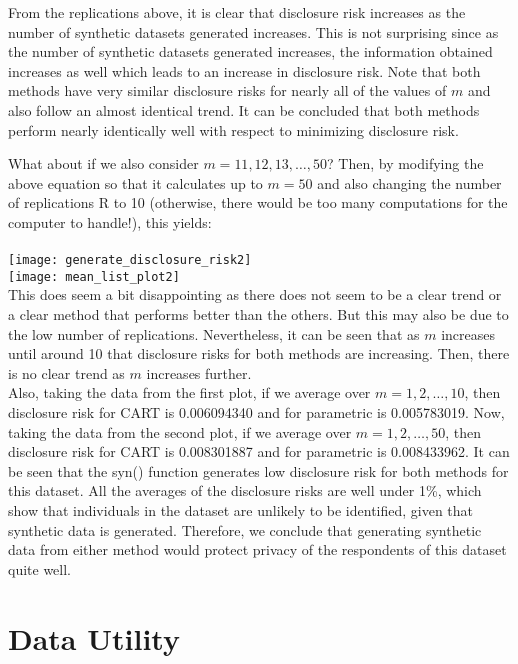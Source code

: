 \documentclass[12pt]{article}
\begin{document}
From the replications above, it is clear that disclosure risk increases as the number of synthetic datasets generated increases. This is not surprising since as the number of synthetic datasets generated increases, the information obtained increases as well which leads to an increase in disclosure risk. Note that both methods have very similar disclosure risks for nearly all of the values of $m$ and also follow an almost identical trend. It can be concluded that both methods perform nearly identically well with respect to minimizing disclosure risk.

What about if we also consider $m=11,12,13,\dots, 50$? Then, by modifying the above equation so that it calculates up to $m=50$ and also changing the number of replications R to 10 (otherwise, there would be too many computations for the computer to handle!), this yields:\\\\
\texttt{[image: generate\_disclosure\_risk2]}\\
\texttt{[image: mean\_list\_plot2]}\\

This does seem a bit disappointing as there does not seem to be a clear trend or a clear method that performs better than the others. But this may also be due to the low number of replications. Nevertheless, it can be seen that as $m$ increases until around 10 that disclosure risks for both methods are increasing. Then, there is no clear trend as $m$ increases further.\\

Also, taking the data from the first plot, if we average over $m=1,2,\dots, 10$, then disclosure risk for CART is 0.006094340 and for parametric is 0.005783019. Now, taking the data from the second plot, if we average over $m=1,2,\dots, 50$, then disclosure risk for CART is 0.008301887 and for parametric is 0.008433962. It can be seen that the syn() function generates low disclosure risk for both methods for this dataset. All the averages of the disclosure risks are well under 1\%, which show that individuals in the dataset are unlikely to be identified, given that synthetic data is generated. Therefore, we conclude that generating synthetic data from either method would protect privacy of the respondents of this dataset quite well. 

\section*{Data Utility}
\end{document}
